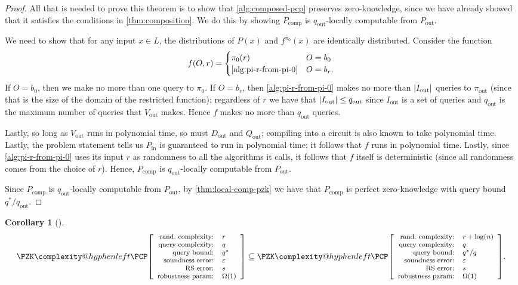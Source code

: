 \documentclass[english,12pt]{reedthesis}
\makeatletter
\theoremstyle{plain}
\newtheorem{cor}[cor]{Corollary}
\theoremstyle{definition}
\theoremstyle{remark}
\DeclareMathOperator{\comp}{comp}
\DeclareMathOperator{\out}{out}
\DeclareMathOperator{\oin}{in}
\DeclarePairedDelimiter{\abs}{\lvert}{\rvert}
\newcommand{\pzkpcpr}[6]{%
  \ensuremath%
  \mleft[{\footnotesize\begin{array}{r l}
    \text{rand.\ complexity:} & #1 \\
    \text{query complexity:} & #2 \\
    \text{query bound:} & #3 \\
    \text{soundness error:} & #4 \\
    \text{RS error:} & #5 \\
    \text{robustness param:} & #6
  \end{array}}\mright]%
}
\newcommand{\PZKPCP}{%
  \PZK\complexity@hyphenleft\PCP
}
\makeatother
\begin{document}
\begin{proof}
  All that is needed to prove this theorem is to show that
  \cref{alg:composed-pcp} preserves zero-knowledge, since we have already showed
  that it satisfies the conditions in \cref{thm:composition}. We do this by
  showing $P_{\comp}$ is $q_{\out}$-locally computable from $P_{\out}$.

  We need to show that for any input $x \in L$, the distributions of $P(x)$ and
  $f^{\pi_{0}}(x)$ are identically distributed. Consider the function
  \begin{equation}
    f(O, r) = \begin{cases}
      \pi_{0}(r) & O = b_{0} \\
      \text{\cref{alg:pi-r-from-pi-0}} & O = b_{r}.
    \end{cases}
  \end{equation}
  If $O = b_{0}$, then we make no more than one query to $\pi_{0}$. If
  $O = b_{r}$, then \cref{alg:pi-r-from-pi-0} makes no more than
  $\abs{I_{\out}}$ queries to $\pi_{\out}$ (since that is the size of the domain
  of the restricted function); regardless of $r$ we have that
  $\abs{I_{\out}} \le q_{\out}$ since $I_{\out}$ is a set of queries and
  $q_{\out}$ is the maximum number of queries that $V_{\out}$ makes. Hence $f$
  makes no more than $q_{\out}$ queries.

  Lastly, so long as $V_{\out}$ runs in polynomial time, so must $D_{\out}$ and
  $Q_{\out}$; compiling into a circuit is also known to take polynomial time.
  Lastly, the problem statement tells us $P_{\oin}$ is guaranteed to run in
  polynomial time; it follows that $f$ runs in polynomial time. Lastly, since
  \cref{alg:pi-r-from-pi-0} uses its input $r$ as randomness to all the
  algorithms it calls, it follows that $f$ itself is deterministic (since all
  randomness comes from the choice of $r$). Hence, $P_{\comp}$ is
  $q_{\out}$-locally computable from $P_{\out}$.

  Since $P_{\comp}$ is $q_{\out}$-locally computable from $P_{\out}$, by
  \cref{thm:local-comp-pzk} we have that $P_{\comp}$ is perfect zero-knowledge
  with query bound $q^{*}/q_{\out}$.
\end{proof}

\begin{cor}[{\cite[Corollary 3.11]{GOS25}}]\label{cor:constant-query}
  \begin{equation}\label{eqn:constant-query}
    \PZKPCP\pzkpcpr{r}{q}{q^{*}}{\varepsilon}{s}{\Omega(1)} \subseteq
    \PZKPCP\pzkpcpr{r + \log(n)}{q}{q^{*}/q}{\varepsilon}{s}{\Omega(1)}.
  \end{equation}
\end{cor}
\end{document}
